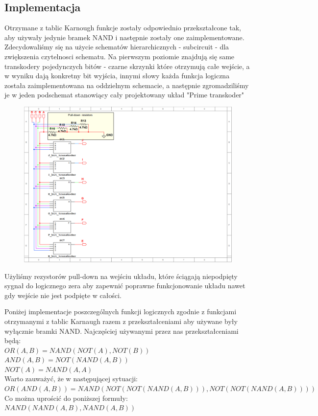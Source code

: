 \documentclass[a4paper]{article}
\begin{document}
\subsection{Implementacja}
Otrzymane z tablic Karnough funkcje zostały odpowiednio przekształcone tak,
 aby używały jedynie bramek NAND i następnie zostały one zaimplementowane. Zdecydowaliśmy się 
 na użycie schematów hierarchicznych - subcircuit - dla zwiększenia czytelnosci schematu. 
 Na pierwszym poziomie znajdują się same transkodery pojedynczych bitów - czarne skrzynki które otrzymują 
 całe wejście, a w wyniku dają konkretny bit wyjścia, innymi słowy każda funkcja logiczna została zaimplementowana
 na oddzielnym schemacie, a następnie zgromadziliśmy je w jeden podschemat stanowiący cały projektowany układ "Prime transkoder"
\begin{figure}[H]
  \centering
  \includegraphics[width=\textwidth]{prime_transkoder.png}
  \label{Podschemat najwyższego rzędu, gromadzący w sobie podschematy właściwych funkcji logicznych}
\end{figure}

Użyliśmy rezystorów pull-down na wejściu układu, które ściągają niepodpięty sygnał do logicznego zera aby 
zapewnić poprawne funkcjonowanie układu nawet gdy wejście nie jest podpięte w całości.

Poniżej implementacje poszczególnych funkcji logicznych zgodnie z funkcjami otrzymanymi z tablic Karnaugh razem z przekształceniami aby używane były wyłącznie bramki NAND.
Najczęściej używanymi przez nas przekształceniami będą:\\
$OR(A,B) = NAND(NOT(A),NOT(B))$\\
$AND(A,B) = NOT(NAND(A,B))$\\
$NOT(A) = NAND(A,A)$\\
Warto zauważyć, że w następującej sytuacji:\\ 
$OR(AND(A,B)) = NAND(NOT(NOT(NAND(A,B))),NOT(NOT(NAND(A,B))))$\\
Co można uprościć do poniższej formuły:\\
$NAND(NAND(A,B),NAND(A,B))$
\end{document}
